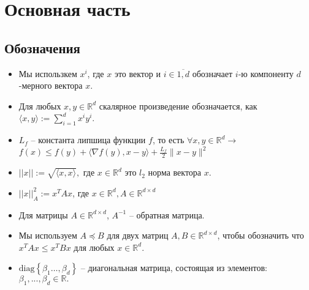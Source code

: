 \section{Основная часть}

\subsection{Обозначения}
\begin{itemize}
    \item Мы использкем $x^i$, где $x$ это вектор и $i \in \overline{1, d}$ обозначает $i$-ю компоненту $d$-мерного вектора $x$.
    \item Для любых $x, y \in \mathbb{R}^d$ скалярное произведение обозначается, как $\langle x, y \rangle := \sum_{i=1}^d x^i y^i$.
    \item $L_f$ -- константа липшица функции $f$, то есть $\forall x, y \in \mathbb{R}^d \rightarrow $ 	$f(x) \leq f(y) + \langle \nabla f(y), x-y \rangle + \frac{L_f}{2} \|x - y\|^2$
    \item $|| x || := \sqrt{\langle x, x \rangle},$ где $x \in \mathbb{R}^d$ это $l_2$ норма вектора $x$.
    \item $|| x ||_A^2 := x^TAx$, где $x \in \mathbb{R}^d, A \in \mathbb{R}^{d \times d}$
    \item Для матрицы $A \in \mathbb{R}^{d \times d}$, $A^{-1}$ -- обратная матрица.
    \item Мы используем $A \preccurlyeq B$ для двух матриц $A, B \in \mathbb{R}^{d \times d}$, чтобы обозначить что $x^TAx \le x^TBx$ для любых $x \in \mathbb{R}^d$.
    \item $\textrm{diag} \left\{ \beta_1 \ldots, \beta_d \right\}$ -- диагональная матрица, состоящая из элементов: $\beta_1, ..., \beta_d \in \mathbb{R}.$
    
\end{itemize}

